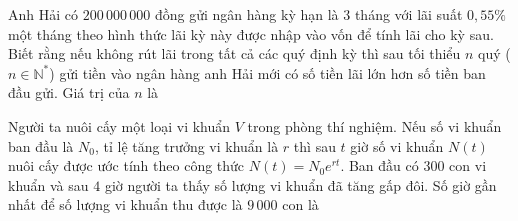 \begin{ex}%
	Anh Hải có $200\,000\,000$ đồng gửi ngân hàng kỳ hạn là $3$ tháng với lãi suất $0{,}55\% $ một tháng theo hình thức  lãi kỳ này được nhập vào vốn để tính lãi cho kỳ sau. Biết rằng nếu không rút lãi trong tất cả các quý định kỳ thì sau tối thiểu $n$ quý ($n\in \mathbb{N}^* $) gửi tiền vào ngân hàng anh Hải mới có số tiền lãi lớn hơn số tiền ban đầu gửi. Giá trị của $n$ là
\end{ex}

\begin{ex}%
	Người ta nuôi cấy một loại vi khuẩn $V$ trong phòng thí nghiệm. Nếu số vi khuẩn ban đầu là $N_0$, tỉ lệ tăng trưởng vi khuẩn là $r$ thì sau $t$ giờ số vi khuẩn $N(t)$ nuôi cấy  được ước tính theo công thức $N(t)=N_0 e^{rt}$. Ban đầu có $300$ con vi khuẩn và sau $4$ giờ người ta thấy số lượng vi khuẩn đã tăng gấp đôi. Số giờ gần nhất để số lượng vi khuẩn thu được là $9\,000$ con là
\end{ex}

